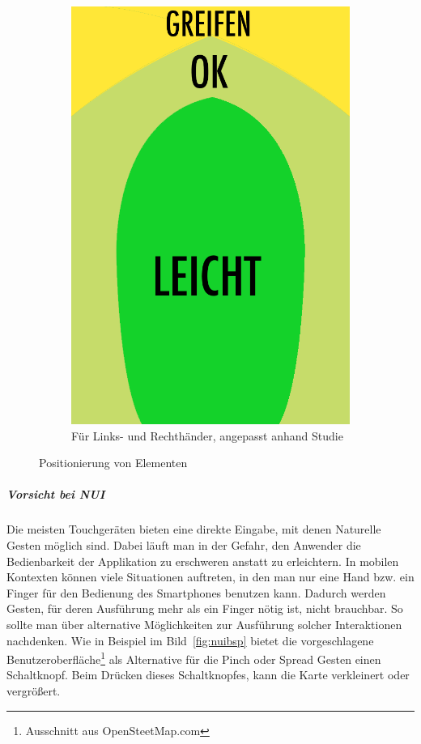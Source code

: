 \begin{figure}
\begin{subfigure}[b]{0.3\textwidth}
			\includegraphics[width=1\textwidth]{img/anordungDerElementeForAll.png}
			\caption{Für Links- und Rechthänder, angepasst anhand Studie \cite{Park:2010tu}}\label{fig:forallPositioning}
			
	\end{subfigure}
	\caption{Positionierung von Elementen}\label{fig:elementPos}
\end{figure}


\subparagraph{Vorsicht bei NUI} 
\label{subp:benutze_nui}

Die meisten Touchgeräten bieten eine direkte Eingabe, mit denen Naturelle Gesten möglich sind. Dabei läuft man in der Gefahr, den Anwender die Bedienbarkeit der Applikation zu erschweren anstatt zu erleichtern. In mobilen Kontexten können viele Situationen auftreten, in den man nur eine Hand bzw. ein Finger für den Bedienung des Smartphones benutzen kann. Dadurch werden Gesten, für deren Ausführung mehr als ein Finger nötig ist, nicht brauchbar. So sollte man über alternative Möglichkeiten zur Ausführung solcher Interaktionen nachdenken. Wie in Beispiel im Bild~\ref{fig:nuibsp} bietet die vorgeschlagene Benutzeroberfläche\footnote{Ausschnitt aus OpenSteetMap.com} als Alternative für die Pinch oder Spread Gesten einen Schaltknopf. Beim Drücken dieses Schaltknopfes, kann die Karte verkleinert oder vergrößert. 

